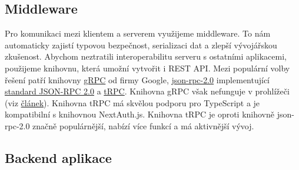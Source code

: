\subsection{Middleware}\label{subsec:middleware}

Pro komunikaci mezi klientem a serverem využijeme middleware.
To nám automaticky zajistí typovou bezpečnost, serializaci dat a zlepší vývojářskou zkušenost.
Abychom neztratili interoperabilitu serveru s ostatními aplikacemi, použijeme knihovnu, která umožní vytvořit i REST API\@.
Mezi populární volby řešení patří knihovny \href{https://grpc.io/}{gRPC} od firmy Google, \href{https://www.npmjs.com/package/json-rpc-2.0}{json-rpc-2.0} implementující \href{https://www.jsonrpc.org/specification}{standard JSON-RPC 2.0}  a \href{https://trpc.io/}{tRPC}.
Knihovna gRPC však nefunguje v prohlížeči (viz \href{https://grpc.io/blog/state-of-grpc-web/}{článek}).
Knihovna tRPC má skvělou podporu pro TypeScript a je kompatibilní s knihovnou NextAuth.js.
Knihovna tRPC je oproti knihovně json-rpc-2.0 značně populárnější, nabízí více funkcí a má aktivnější vývoj.

\subsection{Backend aplikace}\label{subsec:backend-aplikace}

